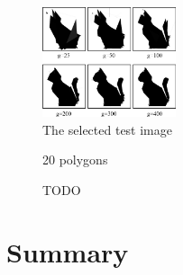 \documentclass[conference]{IEEEtran}
\begin{document}
\begin{figure}[htbp]
	\centering
	\includegraphics[width=0.35\textwidth]{fig/cat6.png}
	\caption{The selected test image}
	\label{cat-6}
\end{figure}


\begin{figure}[htbp]
	\centering
		\resizebox{.45\textwidth}{!}{}
	\caption{20 polygons}
	\label{foo}
\end{figure}

\begin{figure}[htbp]
	\centering
		\resizebox{.45\textwidth}{!}{}
	\caption{TODO}
	\label{foo}
\end{figure}


\section{Summary}
\end{document}
